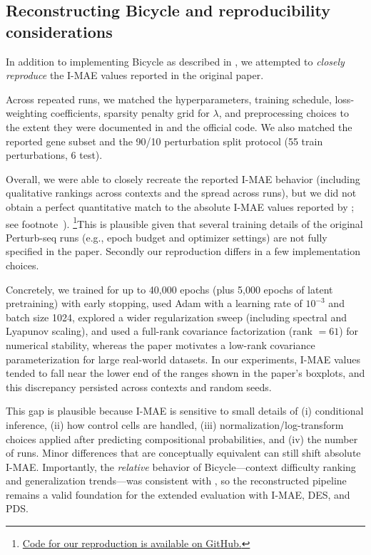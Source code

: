 \documentclass[12pt]{article}
\begin{document}
\subsection{Reconstructing Bicycle and reproducibility considerations}
In addition to implementing Bicycle as described in \cite{rohbeck2024bicycle}, we attempted to
\emph{closely reproduce} the I-MAE values reported in the original paper.

Across repeated runs, we matched the hyperparameters, training schedule, loss-weighting
coefficients, sparsity penalty grid for \(\lambda\), and preprocessing choices to the extent they were
documented in \cite{rohbeck2024bicycle} and the official code. We also matched the reported gene
subset and the 90/10 perturbation split protocol (55 train perturbations, 6 test).

Overall, we were able to closely recreate the reported I-MAE behavior (including qualitative
rankings across contexts and the spread across runs), but we did not obtain a perfect quantitative
match to the absolute I-MAE values reported by \cite{rohbeck2024bicycle}; see footnote~).
\footnote{\label{fn:repro-code}\href{https://github.com/Scooter1337/bicycle-thesis}{Code for our reproduction is available on GitHub.}}This is plausible given
that several training details of the original Perturb-seq runs (e.g., epoch budget and optimizer
settings) are not fully specified in the paper. Secondly our reproduction differs in a few
implementation choices. 

Concretely, we trained for up to 40{,}000 epochs (plus 5{,}000 epochs of
latent pretraining) with early stopping, used Adam with a learning rate of $10^{-3}$ and batch size
1024, explored a wider regularization sweep (including spectral and Lyapunov scaling), and used a
full-rank covariance factorization (rank $=61$) for numerical stability, whereas the paper motivates
a low-rank covariance parameterization for large real-world datasets.
In our experiments, I-MAE values tended to fall near the lower end of the
ranges shown in the paper’s boxplots, and this discrepancy persisted across contexts and random
seeds.

This gap is plausible because I-MAE is sensitive to small details of (i) conditional inference,
(ii) how control cells are handled, (iii) normalization/log-transform choices applied after
predicting compositional probabilities, and (iv) the number of runs. Minor differences that are conceptually equivalent can still
shift absolute I-MAE. Importantly, the \emph{relative} behavior of Bicycle---context difficulty ranking
and generalization trends---was consistent with \cite{rohbeck2024bicycle}, so the reconstructed
pipeline remains a valid foundation for the extended evaluation with I-MAE, DES, and PDS.
\end{document}
